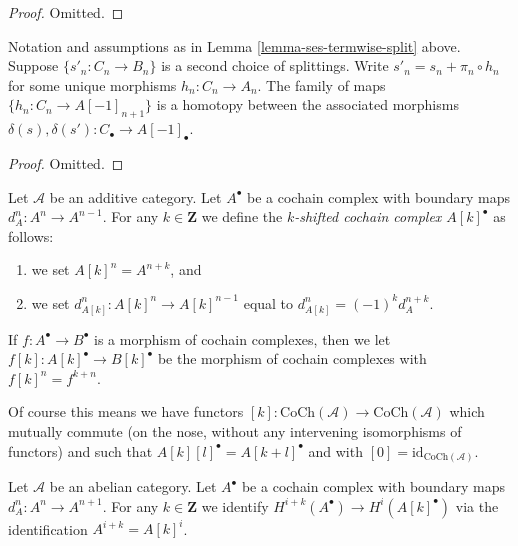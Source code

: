 \begin{proof}
Omitted.
\end{proof}

\begin{lemma}
\label{lemma-ses-termwise-split-homotopy}
Notation and assumptions as in Lemma \ref{lemma-ses-termwise-split} above.
Suppose $\{s'_n : C_n \to B_n\}$ is a second choice of splittings.
Write $s'_n = s_n + \pi_n \circ h_n$ for some unique
morphisms $h_n : C_n \to A_n$. The family of maps
$\{h_n : C_n \to A[-1]_{n + 1}\}$ is a homotopy between
the associated morphisms
$\delta(s), \delta(s') : C_\bullet \to A[-1]_\bullet$.
\end{lemma}

\begin{proof}
Omitted.
\end{proof}



\begin{definition}
\label{definition-shift-cochain}
Let $\mathcal{A}$ be an additive category.
Let $A^\bullet$ be a cochain complex
with boundary maps $d_A^n : A^n \to A^{n - 1}$.
For any $k \in \mathbf{Z}$ we define the
{\it $k$-shifted cochain complex $A[k]^\bullet$}
as follows:
\begin{enumerate}
\item we set $A[k]^n = A^{n + k}$, and
\item we set $d_{A[k]}^n : A[k]^n \to A[k]^{n - 1}$
equal to $d_{A[k]}^n = (-1)^k d_A^{n + k}$.
\end{enumerate}
If $f : A^\bullet \to B^\bullet$ is a morphism of
cochain complexes, then we let
$f[k] : A[k]^\bullet \to B[k]^\bullet$ be the
morphism of cochain complexes with
$f[k]^n = f^{k + n}$.
\end{definition}

\noindent
Of course this means we have functors
$[k] : \text{CoCh}(\mathcal{A}) \to \text{CoCh}(\mathcal{A})$
which mutually commute (on the nose, without
any intervening isomorphisms of functors) and
such that $A[k][l]^\bullet = A[k + l]^\bullet$ and
with $[0] = \text{id}_{\text{CoCh}(\mathcal{A})}$.

\begin{definition}
\label{definition-comology-shift}
Let $\mathcal{A}$ be an abelian category.
Let $A^\bullet$ be a cochain complex
with boundary maps $d_A^n : A^n \to A^{n + 1}$.
For any $k \in \mathbf{Z}$ we identify
{\it $H^{i + k}(A^\bullet) \longrightarrow H^i(A[k]^\bullet)$}
via the identification $A^{i + k} = A[k]^i$.
\end{definition}

